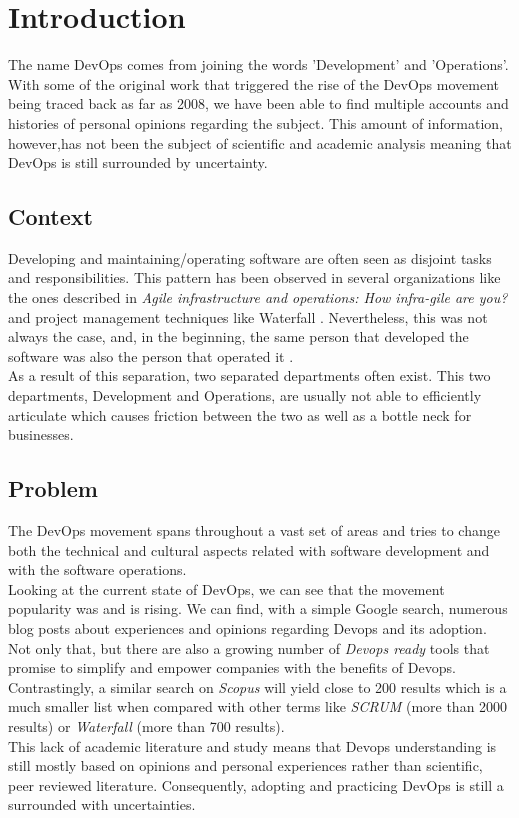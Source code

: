 \chapter{Introduction} \label{chap:introduction}
The name DevOps comes from joining the words 'Development' and 'Operations'. With some of the original work that triggered the rise of the DevOps movement being traced back as far as 2008, we have been able to find multiple accounts and histories of personal opinions regarding the subject. This amount of information, however,has not been the subject of scientific and academic analysis meaning that DevOps is still surrounded by uncertainty.

		\section{Context} \label{chap:introduction:sec:context}
		Developing and maintaining/operating software are often seen as disjoint tasks and responsibilities. This pattern has been observed in several organizations like the ones described in \textit{Agile infrastructure and operations: How infra-gile are you?} \cite{Debois2008} and project management techniques like Waterfall \cite{Royce1970}. Nevertheless, this was not always the case, and, in the beginning, the same person that developed the software was also the person that operated it \cite{Loukides2012}.\\
		As a result of this separation, two separated departments often exist. This two departments, Development and Operations, are usually not able to efficiently articulate which causes friction between the two as well as a bottle neck for businesses.

		\section{Problem} \label{chap:introduction:sec:problem}

		The DevOps movement spans throughout a vast set of areas and tries to change both the technical and cultural aspects related with software development and with the software operations.\\
		Looking at the current state of DevOps, we can see that the movement popularity was and is rising. We can find, with a simple Google search, numerous blog posts about experiences and opinions regarding Devops and its adoption. Not only that, but there are also a growing number of \textit{Devops ready} tools that promise to simplify and empower companies with the benefits of Devops.\\
		Contrastingly, a similar search on \textit{Scopus} will yield close to 200 results which is a much smaller list when compared with other terms like \textit{SCRUM} (more than 2000 results) or \textit{Waterfall} (more than 700 results).\\
		This lack of academic literature and study means that Devops understanding is still mostly based on opinions and personal experiences rather than scientific, peer reviewed literature. Consequently, adopting and practicing DevOps is still a surrounded with uncertainties.

